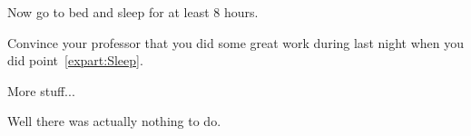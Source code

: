 \documentclass[11pt,a4paper]{article}
\begin{document}
\MakeUebungHeader


\begin{exenumerate} %
\item \label{expart:Sleep} Now go to bed and sleep for at least 8 hours.
\item Convince your professor that you did some great work during last night when you did
  point~\ref{expart:Sleep}.
\end{exenumerate}


\uebung{} %




More stuff...

\begin{solution} %
  Well there was actually nothing to do.
\end{solution}
\end{document}
